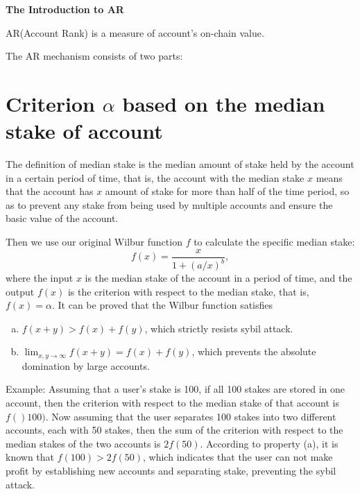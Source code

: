 \documentclass[12pt]{article}
\begin{document}
\pagestyle{empty}

\pagecolor{\pcolor}
  \begin{center}
	\vspace*{0.5cm}
	\vspace{0.5cm}
	\textbf{\huge{The Introduction to AR}}
	\vspace{0.5cm}
	\textbf{}
\end{center}
\setcounter{page}{0}
\pagestyle{fancy}
\vspace*{0.01cm}
AR(Account Rank) is a measure of account’s on-chain value.

\noindent The AR mechanism consists of two parts:
\section*{Criterion $\alpha$ based on the median stake of account}

The definition of median stake is the median amount of stake held by the account in a certain period of time, that is, the account with the median stake $x$ means that the account has $x$ amount of stake for more than half of the time period, so as to prevent any stake from being used by multiple accounts and ensure the basic value of the account.

Then we use our original Wilbur function $f$ to calculate the specific median stake:
$$f(x)=\frac{x}{1+(a/x)^b},$$
where the input $x$ is the median stake of the account in a period of time, and the output $f(x)$ is the criterion with respect to the median stake, that is, $f(x)= \alpha$.
It can be proved that the Wilbur function satisfies
\begin{enumerate}[(a)]
	\item $f(x+y)>f(x)+f(y)$, which strictly resists sybil attack.
	\item $\lim_{x,y\rightarrow \infty} f(x+y)=f(x)+f(y)$, which prevents the absolute domination by large accounts.
\end{enumerate}
Example: Assuming that a user's stake is 100, if all 100 stakes are stored in one account, then the criterion with respect to the median stake of that account is $f()100)$. Now assuming that the user separates 100 stakes into two different accounts, each with 50 stakes, then the sum of the criterion with respect to the median stakes of the two accounts is $2f(50)$. According to property (a), it is known that $f(100)>2f(50)$, which indicates that the user can not make profit by establishing new accounts and separating stake, preventing the sybil attack.
\end{document}
